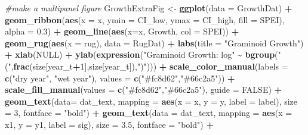 \documentclass[
]{article}
\newenvironment{Shaded}{\begin{snugshade}}{\end{snugshade}}
\newcommand{\CommentTok}[1]{\textcolor[rgb]{0.56,0.35,0.01}{\textit{#1}}}
\newcommand{\DataTypeTok}[1]{\textcolor[rgb]{0.13,0.29,0.53}{#1}}
\newcommand{\DecValTok}[1]{\textcolor[rgb]{0.00,0.00,0.81}{#1}}
\newcommand{\FloatTok}[1]{\textcolor[rgb]{0.00,0.00,0.81}{#1}}
\newcommand{\KeywordTok}[1]{\textcolor[rgb]{0.13,0.29,0.53}{\textbf{#1}}}
\newcommand{\NormalTok}[1]{#1}
\newcommand{\OperatorTok}[1]{\textcolor[rgb]{0.81,0.36,0.00}{\textbf{#1}}}
\newcommand{\OtherTok}[1]{\textcolor[rgb]{0.56,0.35,0.01}{#1}}
\newcommand{\StringTok}[1]{\textcolor[rgb]{0.31,0.60,0.02}{#1}}
\begin{document}
\begin{Shaded}
\begin{Highlighting}[]
\CommentTok{\#make a multipanel figure}
\NormalTok{GrowthExtraFig \textless{}{-}}\StringTok{ }\KeywordTok{ggplot}\NormalTok{(}\DataTypeTok{data =}\NormalTok{ GrowthDat) }\OperatorTok{+}
\StringTok{  }\KeywordTok{geom\_ribbon}\NormalTok{(}\KeywordTok{aes}\NormalTok{(}\DataTypeTok{x =}\NormalTok{ x, }\DataTypeTok{ymin =}\NormalTok{ CI\_low, }\DataTypeTok{ymax =}\NormalTok{ CI\_high, }\DataTypeTok{fill =}\NormalTok{ SPEI), }\DataTypeTok{alpha =} \FloatTok{0.3}\NormalTok{) }\OperatorTok{+}
\StringTok{  }\KeywordTok{geom\_line}\NormalTok{(}\KeywordTok{aes}\NormalTok{(}\DataTypeTok{x=}\NormalTok{x, Growth, }\DataTypeTok{col =}\NormalTok{ SPEI))  }\OperatorTok{+}\StringTok{ }
\StringTok{  }\KeywordTok{geom\_rug}\NormalTok{(}\KeywordTok{aes}\NormalTok{(}\DataTypeTok{x =}\NormalTok{ rug), }\DataTypeTok{data =}\NormalTok{ RugDat) }\OperatorTok{+}
\StringTok{  }\KeywordTok{labs}\NormalTok{(}\DataTypeTok{title =} \StringTok{"Graminoid Growth"}\NormalTok{) }\OperatorTok{+}
\StringTok{  }\KeywordTok{xlab}\NormalTok{(}\OtherTok{NULL}\NormalTok{) }\OperatorTok{+}
\StringTok{  }\KeywordTok{ylab}\NormalTok{(}\KeywordTok{expression}\NormalTok{(}\StringTok{"Graminoid Growth: log"} \OperatorTok{\textasciitilde{}}\StringTok{ }\KeywordTok{bgroup}\NormalTok{(}\StringTok{"("}\NormalTok{,}\KeywordTok{frac}\NormalTok{(size[year\_t}\OperatorTok{+}\DecValTok{1}\NormalTok{],size[year\_t]),}\StringTok{")"}\NormalTok{)))  }\OperatorTok{+}
\StringTok{  }\KeywordTok{scale\_color\_manual}\NormalTok{(}\DataTypeTok{labels =} \KeywordTok{c}\NormalTok{(}\StringTok{"dry year"}\NormalTok{, }\StringTok{"wet year"}\NormalTok{), }\DataTypeTok{values =} \KeywordTok{c}\NormalTok{(}\StringTok{"\#fc8d62"}\NormalTok{,}\StringTok{"\#66c2a5"}\NormalTok{)) }\OperatorTok{+}
\StringTok{  }\KeywordTok{scale\_fill\_manual}\NormalTok{(}\DataTypeTok{values =} \KeywordTok{c}\NormalTok{(}\StringTok{"\#fc8d62"}\NormalTok{,}\StringTok{"\#66c2a5"}\NormalTok{), }\DataTypeTok{guide =} \OtherTok{FALSE}\NormalTok{) }\OperatorTok{+}
\StringTok{  }\KeywordTok{geom\_text}\NormalTok{(}\DataTypeTok{data=}\NormalTok{ dat\_text, }\DataTypeTok{mapping =} \KeywordTok{aes}\NormalTok{(}\DataTypeTok{x =}\NormalTok{ x, }\DataTypeTok{y =}\NormalTok{ y, }\DataTypeTok{label =}\NormalTok{ label), }\DataTypeTok{size =} \DecValTok{3}\NormalTok{, }\DataTypeTok{fontface =} \StringTok{"bold"}\NormalTok{) }\OperatorTok{+}
\StringTok{  }\KeywordTok{geom\_text}\NormalTok{(}\DataTypeTok{data =}\NormalTok{ dat\_text, }\DataTypeTok{mapping =} \KeywordTok{aes}\NormalTok{(}\DataTypeTok{x =}\NormalTok{ x1, }\DataTypeTok{y =}\NormalTok{ y1, }\DataTypeTok{label =}\NormalTok{ sig), }\DataTypeTok{size =} \FloatTok{3.5}\NormalTok{, }\DataTypeTok{fontface =} \StringTok{"bold"}\NormalTok{) }\OperatorTok{+}

\end{Highlighting}
\end{Shaded}
\end{document}
